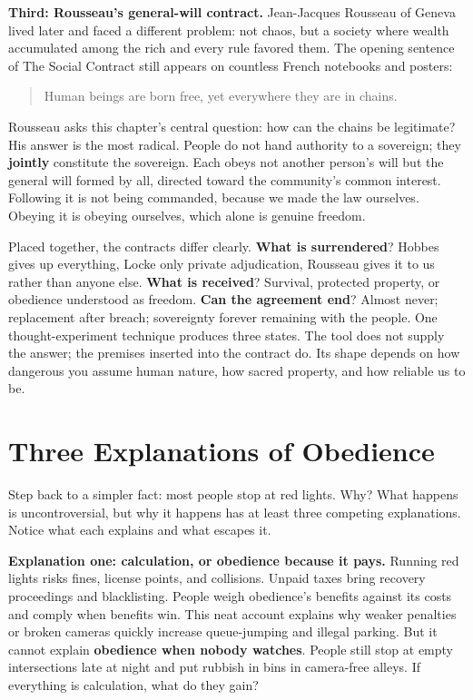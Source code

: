 \textbf{Third: Rousseau's general-will contract.} Jean-Jacques Rousseau of Geneva lived later and faced a different problem: not chaos, but a society where wealth accumulated among the rich and every rule favored them. The opening sentence of The Social Contract still appears on countless French notebooks and posters:

\begin{quote}
Human beings are born free, yet everywhere they are in chains.
\end{quote}
Rousseau asks this chapter's central question: how can the chains be legitimate? His answer is the most radical. People do not hand authority to a sovereign; they \textbf{jointly} constitute the sovereign. Each obeys not another person's will but the general will formed by all, directed toward the community's common interest. Following it is not being commanded, because we made the law ourselves. Obeying it is obeying ourselves, which alone is genuine freedom.

Placed together, the contracts differ clearly. \textbf{What is surrendered}? Hobbes gives up everything, Locke only private adjudication, Rousseau gives it to us rather than anyone else. \textbf{What is received}? Survival, protected property, or obedience understood as freedom. \textbf{Can the agreement end}? Almost never; replacement after breach; sovereignty forever remaining with the people. One thought-experiment technique produces three states. The tool does not supply the answer; the premises inserted into the contract do. Its shape depends on how dangerous you assume human nature, how sacred property, and how reliable us to be.

\section{Three Explanations of Obedience}
Step back to a simpler fact: most people stop at red lights. Why? What happens is uncontroversial, but why it happens has at least three competing explanations. Notice what each explains and what escapes it.

\textbf{Explanation one: calculation, or obedience because it pays.} Running red lights risks fines, license points, and collisions. Unpaid taxes bring recovery proceedings and blacklisting. People weigh obedience's benefits against its costs and comply when benefits win. This neat account explains why weaker penalties or broken cameras quickly increase queue-jumping and illegal parking. But it cannot explain \textbf{obedience when nobody watches}. People still stop at empty intersections late at night and put rubbish in bins in camera-free alleys. If everything is calculation, what do they gain?


